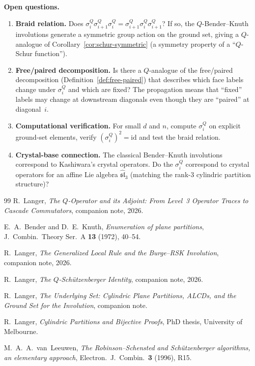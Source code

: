 \documentclass[11pt]{article}
\theoremstyle{plain}
\theoremstyle{definition}
\begin{document}
\medskip
\noindent\textbf{Open questions.}
\begin{enumerate}
  \item \textbf{Braid relation.}\;
    Does $\sigma_i^Q \sigma_{i+1}^Q \sigma_i^Q
    = \sigma_{i+1}^Q \sigma_i^Q \sigma_{i+1}^Q$?
    If so, the $Q$-Bender--Knuth involutions generate a
    symmetric group action on the ground set, giving a
    $Q$-analogue of Corollary~\ref{cor:schur-symmetric}
    (a symmetry property of a ``$Q$-Schur function'').

  \item \textbf{Free/paired decomposition.}\;
    Is there a $Q$-analogue of the free/paired decomposition
    (Definition~\ref{def:free-paired}) that describes which
    face labels change under $\sigma_i^Q$ and which are
    fixed?  The propagation means that ``fixed'' labels may
    change at downstream diagonals even though they are
    ``paired'' at diagonal~$i$.

  \item \textbf{Computational verification.}\;
    For small $d$ and $n$, compute $\sigma_i^Q$ on explicit
    ground-set elements, verify $(\sigma_i^Q)^2 = \mathrm{id}$
    and test the braid relation.

  \item \textbf{Crystal-base connection.}\;
    The classical Bender--Knuth involutions correspond to
    Kashiwara's crystal operators.  Do the $\sigma_i^Q$
    correspond to crystal operators for an affine Lie algebra
    $\widehat{\mathfrak{sl}}_3$ (matching the rank-$3$
    cylindric partition structure)?
\end{enumerate}


\begin{thebibliography}{99}
  R.~Langer,
  \emph{The $Q$-Operator and its Adjoint: From Level~3
  Operator Traces to Cascade Commutators},
  companion note, 2026.

  E.~A.~Bender and D.~E.~Knuth,
  \emph{Enumeration of plane partitions},
  J.~Combin.\ Theory Ser.~A \textbf{13} (1972), 40--54.

  R.~Langer,
  \emph{The Generalized Local Rule and the Burge--RSK
  Involution},
  companion note, 2026.

  R.~Langer,
  \emph{The $Q$-Sch\"utzenberger Identity},
  companion note, 2026.

  R.~Langer,
  \emph{The Underlying Set: Cylindric Plane Partitions, ALCDs,
  and the Ground Set for the Involution},
  companion note.

  R.~Langer,
  \emph{Cylindric Partitions and Bijective Proofs},
  PhD thesis, University of Melbourne.

  M.~A.~A.~van~Leeuwen,
  \emph{The Robinson--Schensted and Sch\"utzenberger
  algorithms, an elementary approach},
  Electron.~J.~Combin.\ \textbf{3} (1996), R15.
\end{thebibliography}
\end{document}
